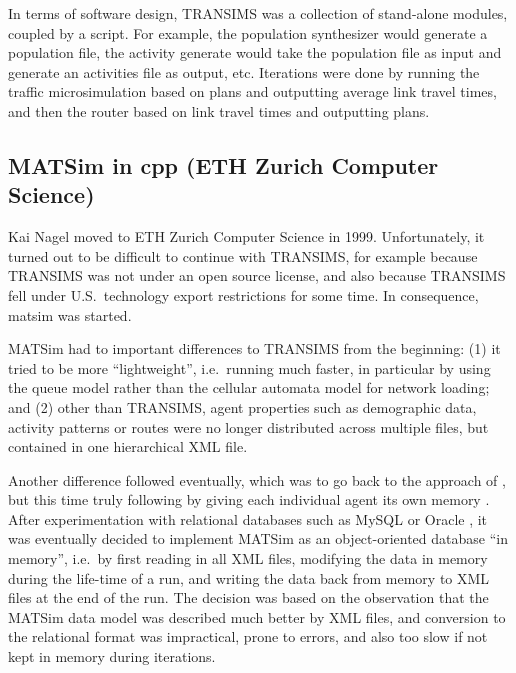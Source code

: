 
In terms of software design, TRANSIMS was a collection of stand-alone modules, coupled by a script.  For example, the population synthesizer would generate a population file, the activity generate would take the population file as input and generate an activities file as output, etc.  Iterations were done by running the traffic microsimulation based on plans and outputting average link travel times, and then the router based on link travel times and outputting plans.


\subsection{MATSim in \gls{cpp} (ETH Zurich Computer Science)}
\label{sec:history-ethz-phase}

Kai Nagel moved to ETH Zurich Computer Science in 1999.  Unfortunately, it turned out to be difficult to continue with TRANSIMS, for example because TRANSIMS was not under an open source license, and also because TRANSIMS fell under U.S.\ technology export restrictions for some time.  In consequence, \acrshort{matsim} was started.

MATSim had to important differences to TRANSIMS from the beginning: (1) it tried to be more ``lightweight'', i.e.\ running much faster, in particular by using the queue model \citep{GawronPhd,Gawron1998IterativeAlgorithmto} rather than the cellular automata model for network loading; and (2) other than TRANSIMS, agent properties such as demographic data, activity patterns or routes were no longer distributed across multiple files, but contained in one hierarchical XML file.

Another difference followed eventually, which was to go back to the approach of \citet{Nagel1996NRW}, but this time truly following \citet{ArthurBar} by giving each individual agent its own memory \citep{RaneyNagel2006traf-framework}.  After experimentation with relational databases such as MySQL \citep{mysql-wikipedia} or Oracle \citep{oracle}, it was eventually decided to implement MATSim as an object-oriented database ``in memory'', i.e.\ by first reading in all XML files, modifying the data in memory during the life-time of a run, and writing the data back from memory to XML files at the end of the run.  The decision was based on the observation that the MATSim data model was described much better by XML files, and conversion to the relational format was impractical, prone to errors, and also too slow if not kept in memory during iterations. 

